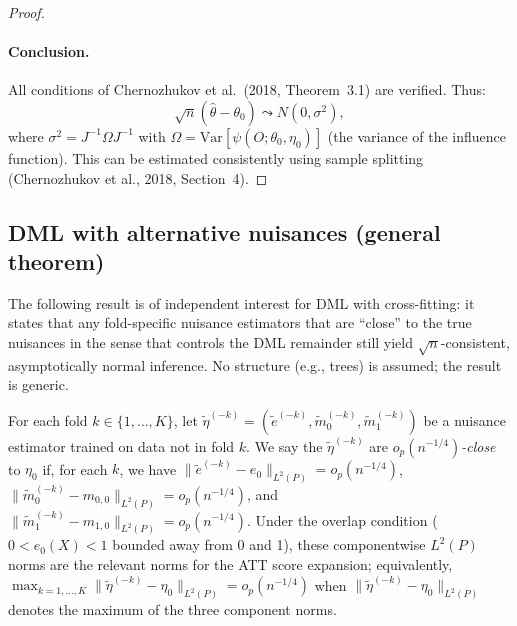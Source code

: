 \documentclass[12pt]{article}
\begin{document}
\begin{proof}
\paragraph{Conclusion.}
All conditions of Chernozhukov et al.\ (2018, Theorem~3.1) are verified. Thus:
\[
\sqrt{n}(\hat\theta - \theta_0) \leadsto N(0, \sigma^2),
\]
where $\sigma^2 = J^{-1} \Omega J^{-1}$ with $\Omega = \text{Var}[\psi(O; \theta_0, \eta_0)]$ (the variance of the influence function). This can be estimated consistently using sample splitting (Chernozhukov et al., 2018, Section~4).
\end{proof}

\subsection{DML with alternative nuisances (general theorem)}
\label{app:alt-nuisances}

The following result is of independent interest for DML with cross-fitting: it states that any fold-specific nuisance estimators that are ``close'' to the true nuisances in the sense that controls the DML remainder still yield $\sqrt{n}$-consistent, asymptotically normal inference. No structure (e.g., trees) is assumed; the result is generic.

\begin{definition}
\label{def:close}
For each fold $k \in \{1,\ldots,K\}$, let $\tilde{\eta}^{(-k)} = (\tilde{e}^{(-k)}, \tilde{m}_0^{(-k)}, \tilde{m}_1^{(-k)})$ be a nuisance estimator trained on data not in fold $k$. We say the $\tilde{\eta}^{(-k)}$ are \emph{$o_p(n^{-1/4})$-close} to $\eta_0$ if, for each $k$, we have $\|\tilde{e}^{(-k)} - e_0\|_{L^2(P)} = o_p(n^{-1/4})$, $\|\tilde{m}_0^{(-k)} - m_{0,0}\|_{L^2(P)} = o_p(n^{-1/4})$, and $\|\tilde{m}_1^{(-k)} - m_{1,0}\|_{L^2(P)} = o_p(n^{-1/4})$. Under the overlap condition ($0 < e_0(X) < 1$ bounded away from 0 and 1), these componentwise $L^2(P)$ norms are the relevant norms for the ATT score expansion; equivalently, $\max_{k=1,\ldots,K} \|\tilde{\eta}^{(-k)} - \eta_0\|_{L^2(P)} = o_p(n^{-1/4})$ when $\|\tilde{\eta}^{(-k)} - \eta_0\|_{L^2(P)}$ denotes the maximum of the three component norms.
\end{definition}
\end{document}
